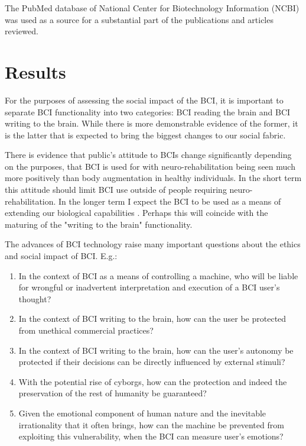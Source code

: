 \documentclass[fleqn,11pt]{olplainarticle}
\begin{document}
The PubMed database of  National Center for Biotechnology Information (NCBI) was used as a source for a substantial part of the publications and articles reviewed.

\section{Results} \label{results}
For the purposes of assessing the social impact of the BCI, it is important to separate BCI functionality into two categories: BCI reading the brain and BCI writing to the brain. While there is more demonstrable evidence of the former, it is the latter that is expected to bring the biggest changes to our social fabric. 

There is evidence that public's attitude to BCIs change significantly depending on the purposes, that BCI is used for \cite{meyer2018disabled} with neuro-rehabilitation being seen much more positively than body augmentation in healthy individuals. In the short term this attitude should limit BCI use outside of people requiring neuro-rehabilitation. In the longer term I expect the BCI to be used as a means of extending our biological capabilities \cite{warwick2003cyborg}. Perhaps this will coincide with the maturing of the "writing to the brain" functionality.

The advances of BCI technology raise many important questions about the ethics and social impact of BCI. E.g.:
\begin{enumerate}
    \item In the context of BCI as a means of controlling a machine, who will be liable for wrongful or inadvertent interpretation and execution of a BCI user's thought?
    \item In the context of BCI writing to the brain, how can the user be protected from unethical commercial practices?
    \item In the context of BCI writing to the brain, how can the user's autonomy be protected if their decisions can be directly influenced by external stimuli?
    \item With the potential rise of cyborgs, how can the protection and indeed the preservation of the rest of humanity be guaranteed?
    \item Given the emotional component of human nature and the inevitable irrationality that it often brings, how can the machine be prevented from exploiting this vulnerability, when the BCI can measure user's emotions? 
\end{enumerate}
\end{document}
